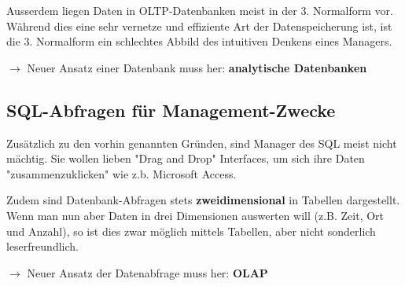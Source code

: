 \documentclass[a4paper, 11pt]{article}
\begin{document}
Ausserdem liegen Daten in OLTP-Datenbanken meist in der 3. Normalform vor. Während dies eine sehr vernetze und effiziente Art der Datenspeicherung ist, ist die 3. Normalform ein schlechtes Abbild des intuitiven Denkens eines Managers.

$\rightarrow$ Neuer Ansatz einer Datenbank muss her: \textbf{analytische Datenbanken}

\subsection{SQL-Abfragen für Management-Zwecke}
Zusätzlich zu den vorhin genannten Gründen, sind Manager des SQL meist nicht mächtig. Sie wollen lieben "Drag and Drop" Interfaces, um sich ihre Daten "zusammenzuklicken" wie z.b. Microsoft Access.

Zudem sind Datenbank-Abfragen stets \textbf{zweidimensional} in Tabellen dargestellt. Wenn man nun aber Daten in drei Dimensionen auswerten will (z.B. Zeit, Ort und Anzahl), so ist dies zwar möglich mittels Tabellen, aber nicht sonderlich leserfreundlich.

$\rightarrow$ Neuer Ansatz der Datenabfrage muss her: \textbf{OLAP}

\end{document}
